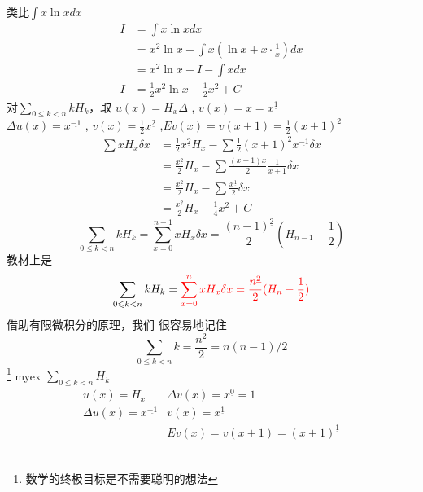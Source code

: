 \documentclass[mode=geye]{elegantnote}
\newcommand{\fallingfactorial}[1]{%
  ^{\underline{#1}}%
}
\begin{document}
类比$ \int x\ln{x} dx $ 
\begin{align*}
    I &= \int x\ln{x} dx \\
    &= x^2 \ln{x} - \int x(\ln{x}+x\cdot \frac{1}{x})dx\\
    &= x^2 \ln{x} - I - \int xdx\\
    I &= \frac{1}{2}x^2 \ln{x} - \frac{1}{2}x^2 + C
\end{align*}
对$ \sum_{0\leqslant k< n} k H_k $，取 $ u(x)=H_x \Delta $ , $ v(x)=x = x\fallingfactorial{1}$\\
$ \Delta u(x) = x\fallingfactorial{-1} $ , $ v(x) = \frac{1}{2}x\fallingfactorial{2} $ ,$ Ev(x) = v(x+1)=\frac{1}{2}(x+1)\fallingfactorial{2} $ 
\begin{align*}
    \sum x H_x \delta x
    &= \frac{1}{2}x\fallingfactorial{2}H_x - \sum \frac{1}{2}(x+1)\fallingfactorial{2}x\fallingfactorial{-1} \delta x\\
    &= \frac{x\fallingfactorial{2}}{2}H_x - \sum \frac{(x+1)x}{2} \frac{1}{x+1} \delta x\\
    &= \frac{x\fallingfactorial{2}}{2}H_x - \sum \frac{x\fallingfactorial{1}}{2}\delta x\\
    &= \frac{x\fallingfactorial{2}}{2}H_x - \frac{1}{4}x\fallingfactorial{2}+C
\end{align*}
\begin{equation*}
    \sum_{0\leqslant k< n} k H_k 
    = \sum_{x=0}^{n-1}x H_x \delta x = \frac{(n-1)\fallingfactorial{2}}{2}(H_{n-1}-\frac{1}{2})
\end{equation*}
教材上是
\begin{equation*}
    \sum_{0\leqslant k< n} k H_k 
    = {\color{red}\sum_{x=0}^{n}x H_x \delta x = \frac{n\fallingfactorial{2}}{2}(H_{n}-\frac{1}{2})}
\end{equation*}
{\color{blue}借助有限微积分的原理，我们
很容易地记住}
\begin{equation}
    \sum_{0\leqslant k<n}k = \frac{n\fallingfactorial{2}}{2} = n(n-1)/2
\end{equation}
\footnote{数学的终极目标是不需要聪明的想法}
myex $ \sum_{0\leqslant k < n}H_k $ 
\begin{equation*}
    \begin{array}{ll}
        u(x) = H_x & \Delta v(x) = x\fallingfactorial{0}=1 \\
        \Delta u(x) = x\fallingfactorial{-1} & v(x) = x\fallingfactorial{1} \\
        & E v(x) = v(x+1) = (x+1)\fallingfactorial{1}\\
    \end{array}
\end{equation*}
\end{document}
